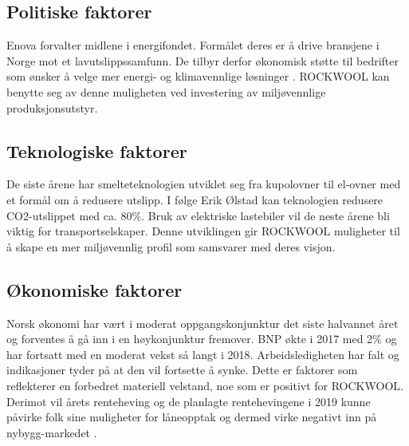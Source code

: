 \begin{table}[ht]
\centering
{}
\caption{Makrofaktorer}
\label{Makrofaktorer}
\end{table}

\subsection{Politiske faktorer}
Enova forvalter midlene i energifondet. Formålet deres er å drive bransjene i Norge mot et lavutslippssamfunn. De tilbyr derfor økonomisk støtte til bedrifter som ønsker å velge mer energi- og klimavennlige løsninger \cite{Enova}. ROCKWOOL kan benytte seg av denne muligheten ved investering av miljøvennlige produksjonsutstyr.

\subsection{Teknologiske faktorer}
De siste årene har smelteteknologien utviklet seg fra kupolovner til el-ovner med et formål om å redusere utslipp. I følge Erik Ølstad kan teknologien redusere CO2-utslippet med ca. 80\%. Bruk av elektriske lastebiler vil de neste årene bli viktig for transportselskaper. Denne utviklingen gir ROCKWOOL muligheter til å skape en mer miljøvennlig profil som samsvarer med deres visjon.

\subsection{Økonomiske faktorer}
Norsk økonomi har vært i moderat oppgangskonjunktur det siste halvannet året og forventes å gå inn i en høykonjunktur fremover. BNP økte i 2017 med 2\% og har fortsatt med en moderat vekst så langt i 2018. Arbeidsledigheten har falt og indikasjoner tyder på at den vil fortsette å synke. Dette er faktorer som reflekterer en forbedret materiell velstand, noe som er positivt for ROCKWOOL. Derimot vil årets renteheving og de planlagte rentehevingene i 2019 kunne påvirke folk sine muligheter for låneopptak og dermed virke negativt inn på nybygg-markedet \cite{SSB}.

